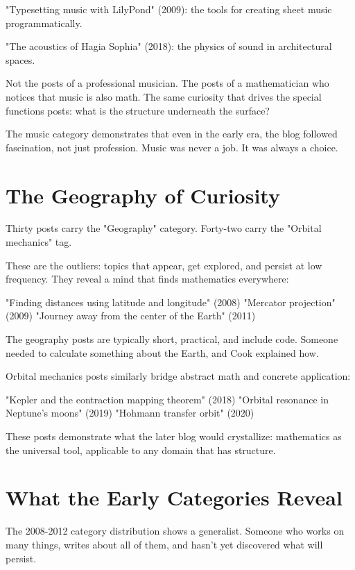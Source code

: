 "Typesetting music with LilyPond" (2009): the tools for creating sheet music programmatically.

"The acoustics of Hagia Sophia" (2018): the physics of sound in architectural spaces.

Not the posts of a professional musician. The posts of a mathematician who notices that music is also math. The same curiosity that drives the special functions posts: what is the structure underneath the surface?

The music category demonstrates that even in the early era, the blog followed fascination, not just profession. Music was never a job. It was always a choice.

\bigskip

\section*{The Geography of Curiosity}

Thirty posts carry the "Geography" category. Forty-two carry the "Orbital mechanics" tag.

These are the outliers: topics that appear, get explored, and persist at low frequency. They reveal a mind that finds mathematics everywhere:

"Finding distances using latitude and longitude" (2008)
"Mercator projection" (2009)
"Journey away from the center of the Earth" (2011)

The geography posts are typically short, practical, and include code. Someone needed to calculate something about the Earth, and Cook explained how.

Orbital mechanics posts similarly bridge abstract math and concrete application:

"Kepler and the contraction mapping theorem" (2018)
"Orbital resonance in Neptune's moons" (2019)
"Hohmann transfer orbit" (2020)

These posts demonstrate what the later blog would crystallize: mathematics as the universal tool, applicable to any domain that has structure.

\bigskip

\section*{What the Early Categories Reveal}

The 2008-2012 category distribution shows a generalist. Someone who works on many things, writes about all of them, and hasn't yet discovered what will persist.

